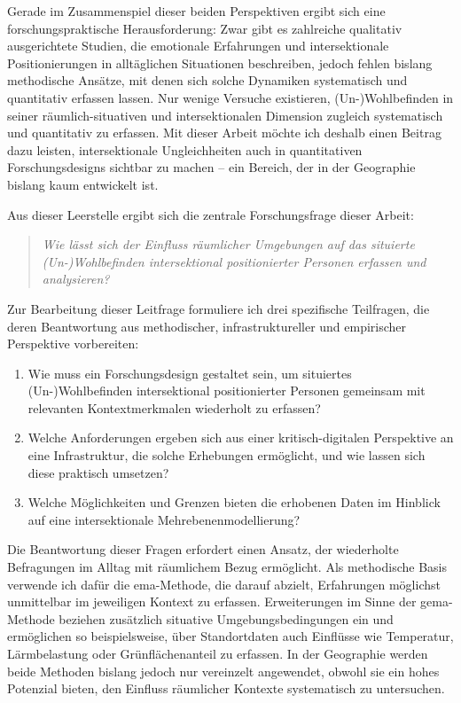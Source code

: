 Gerade im Zusammenspiel dieser beiden Perspektiven ergibt sich eine forschungspraktische Herausforderung: Zwar gibt es zahlreiche qualitativ ausgerichtete Studien, die emotionale Erfahrungen und intersektionale Positionierungen in alltäglichen Situationen beschreiben, jedoch fehlen bislang methodische Ansätze, mit denen sich solche Dynamiken systematisch und quantitativ erfassen lassen. Nur wenige Versuche existieren,  (Un-)Wohlbefinden in seiner räumlich-situativen und intersektionalen Dimension zugleich systematisch und quantitativ zu erfassen. Mit dieser Arbeit möchte ich deshalb einen Beitrag dazu leisten, intersektionale Ungleichheiten auch in quantitativen Forschungsdesigns sichtbar zu machen -- ein Bereich, der in der Geographie bislang kaum entwickelt ist.

\vspace{1em}

Aus dieser Leerstelle ergibt sich die zentrale Forschungsfrage dieser Arbeit:
\begin{quote}
\emph{Wie lässt sich der Einfluss räumlicher Umgebungen auf das situierte (Un-)Wohlbefinden intersektional positionierter Personen erfassen und analysieren?}
\end{quote}

Zur Bearbeitung dieser Leitfrage formuliere ich drei spezifische Teilfragen, die deren Beantwortung aus methodischer, infrastruktureller und empirischer Perspektive vorbereiten:

\begin{enumerate}
    \item Wie muss ein Forschungsdesign gestaltet sein, um situiertes (Un-)Wohlbefinden intersektional positionierter Personen gemeinsam mit relevanten Kontextmerkmalen wiederholt zu erfassen?
    \item Welche Anforderungen ergeben sich aus einer kritisch-digitalen Perspektive an eine Infrastruktur, die solche Erhebungen ermöglicht, und wie lassen sich diese praktisch umsetzen?
    \item Welche Möglichkeiten und Grenzen bieten die erhobenen Daten im Hinblick auf eine intersektionale Mehrebenenmodellierung?
\end{enumerate}

Die Beantwortung dieser Fragen erfordert einen Ansatz, der wiederholte Befragungen im Alltag mit räumlichem Bezug ermöglicht. Als methodische Basis verwende ich dafür die \gls{ema}-Methode, die darauf abzielt, Erfahrungen möglichst unmittelbar im jeweiligen Kontext zu erfassen. Erweiterungen im Sinne der \gls{gema}-Methode beziehen zusätzlich situative Umgebungsbedingungen ein und ermöglichen so beispielsweise, über Standortdaten auch Einflüsse wie Temperatur, Lärmbelastung oder Grünflächenanteil zu erfassen. In der Geographie werden beide Methoden bislang jedoch nur vereinzelt angewendet, obwohl sie ein hohes Potenzial bieten, den Einfluss räumlicher Kontexte systematisch zu untersuchen.

